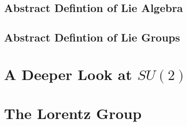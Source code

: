 \documentclass[]{article}
\begin{document}
\subsection{Abstract Defintion of Lie Algebra}
\subsection{Abstract Defintion of Lie Groups}

\section{A Deeper Look at $SU(2)$}
\section{The Lorentz Group}






\end{document}
